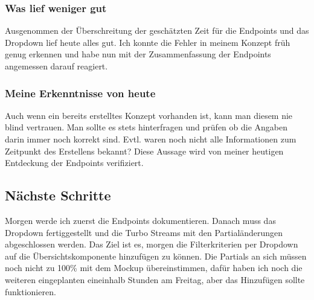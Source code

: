 \subsubsection*{Was lief weniger gut}
Ausgenommen der Überschreitung der geschätzten Zeit für die Endpoints und das Dropdown lief heute alles gut.
Ich konnte die Fehler in meinem Konzept früh genug erkennen und habe nun mit der Zusammenfassung der Endpoints angemessen darauf reagiert.  

\subsubsection*{Meine Erkenntnisse von heute}
Auch wenn ein bereits erstelltes Konzept vorhanden ist, kann man diesem nie blind vertrauen. Man sollte es stets hinterfragen und prüfen
ob die Angaben darin immer noch korrekt sind. Evtl. waren noch nicht alle Informationen zum Zeitpunkt des Erstellens bekannt? Diese Aussage wird von meiner 
heutigen Entdeckung der Endpoints verifiziert.

\subsection*{Nächste Schritte}
Morgen werde ich zuerst die Endpoints dokumentieren. Danach muss das Dropdown fertiggestellt und die Turbo Streams mit den Partialänderungen abgeschlossen werden. 
Das Ziel ist es, morgen die Filterkriterien per Dropdown auf die Übersichtskomponente hinzufügen zu können. Die Partials an sich müssen noch nicht zu 100\% mit dem Mockup
übereinstimmen, dafür haben ich noch die weiteren eingeplanten eineinhalb Stunden am Freitag, aber das Hinzufügen sollte funktionieren.

\pagebreak
